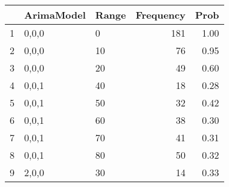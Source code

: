 \begin{table}[ht]
\centering
\begin{tabular}{rllrr}
  \hline
 & ArimaModel & Range & Frequency & Prob \\ 
  \hline
1 & 0,0,0 & 0 & 181 & 1.00 \\ 
  2 & 0,0,0 & 10 &  76 & 0.95 \\ 
  3 & 0,0,0 & 20 &  49 & 0.60 \\ 
  4 & 0,0,1 & 40 &  18 & 0.28 \\ 
  5 & 0,0,1 & 50 &  32 & 0.42 \\ 
  6 & 0,0,1 & 60 &  38 & 0.30 \\ 
  7 & 0,0,1 & 70 &  41 & 0.31 \\ 
  8 & 0,0,1 & 80 &  50 & 0.32 \\ 
  9 & 2,0,0 & 30 &  14 & 0.33 \\ 
   \hline
\end{tabular}
\end{table}
